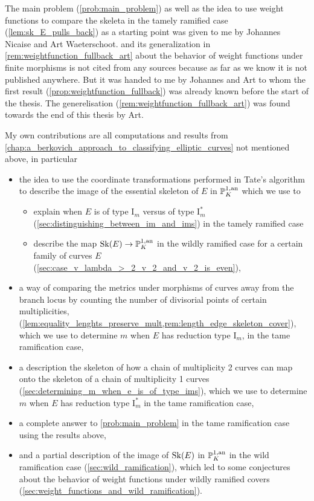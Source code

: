 The main problem (\cref{prob:main_problem}) as well as the idea to use weight functions to compare the skeleta in the tamely ramified case (\cref{lem:sk_E_pulls_back}) as a starting point was given to me by Johannes Nicaise and Art Waeterschoot.
 and its generalization in \cref{rem:weightfunction_fullback_art} about the behavior of weight functions under finite morphisms is not cited from any sources because as far as we know it is not published anywhere. 
But it was handed to me by Johannes and Art to whom the first result (\cref{prop:weightfunction_fullback}) was already known before the start of the thesis. 
The generelisation (\cref{rem:weightfunction_fullback_art}) was found towards the end of this thesis by Art.
\medskip

My own contributions are all computations and results from \cref{chap:a_berkovich_approach_to_classifying_elliptic_curves} not mentioned above, in particular
\begin{itemize}
	\item the idea to use the coordinate transformations performed in Tate's algorithm to describe the image of the essential skeleton of $E$ in $\mathbb{P}^{1, \text{an}}_K$ which we use to 
		\begin{itemize}
			\item explain when $E$ is of type $\mathrm I_m$ versus of type $\mathrm I_m^*$ (\cref{sec:distinguishing_between_im_and_ims}) in the tamely ramified case
			\item describe the map $\operatorname{Sk}(E) \to \mathbb{P}^{1, \text{an}}_K$ in the wildly ramified case for a certain family of curves $E$ (\cref{sec:case_v_lambda_>_2_v_2_and_v_2_is_even}),
		\end{itemize}
	\item a way of comparing the metrics under morphisms of curves away from the branch locus by counting the number of divisorial points of certain multiplicities, (\cref{lem:equality_lenghts_preserve_mult,rem:length_edge_skeleton_cover}), which we use to determine $m$ when $E$ has reduction type $\mathrm I_m$, in the tame ramification case, 
	\item a description the skeleton of how a chain of multiplicity 2 curves can map onto the skeleton of a chain of multiplicity 1 curves (\cref{sec:determining_m_when_e_is_of_type_ims}), which we use to determine $m$ when $E$ has reduction type $\mathrm I_m^*$ in the tame ramification case,
	\item a complete answer to \cref{prob:main_problem} in the tame ramification case using the results above,
	\item and a partial description of the image of $\operatorname{Sk}(E)$ in $\mathbb{P}^{1, \text{an}}_K$ in the wild ramification case (\cref{sec:wild_ramification}), which led to some conjectures about the behavior of weight functions under wildly ramified covers (\cref{sec:weight_functions_and_wild_ramification}). 
\end{itemize}

